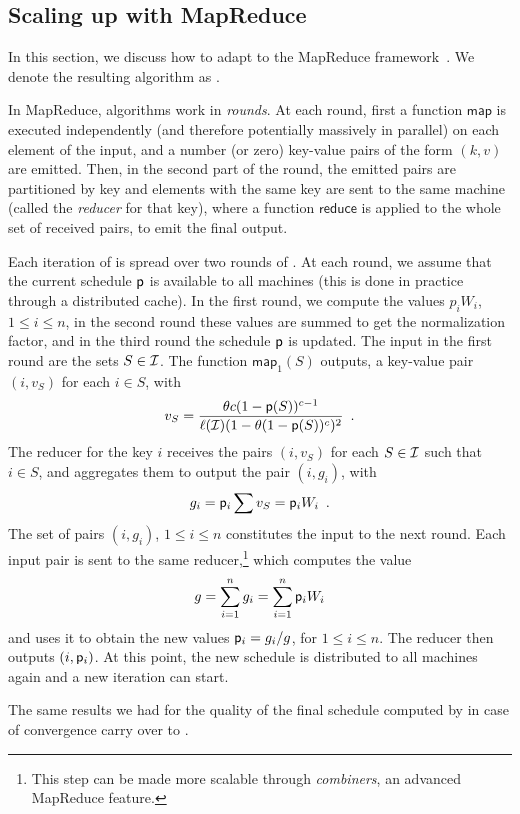 \subsection{Scaling up with MapReduce}\label{sec:mapreduce}
In this section, we discuss how to adapt \algonameapx to the
MapReduce framework~\citep{dean2008mapreduce}. We denote the resulting algorithm
as \algonamemr.

In MapReduce, algorithms work in \emph{rounds}. At each round, first a function
$\mathsf{map}$ is executed independently (and therefore potentially massively in
parallel) on each element of the input, and a number (or zero) key-value pairs
of the form $(k,v)$ are emitted. Then, in the second part of the round, the
emitted pairs are partitioned by key and elements with the same key are sent to
the same machine (called the \emph{reducer} for that key), where a function
$\mathsf{reduce}$ is applied to the whole set of received pairs, to emit the
final output.

Each iteration of \algonameapx is spread over two rounds of \algonamemr. At
each round, we assume that the current schedule $\mathsf{p}$ is available to all
machines (this is done in practice through a distributed cache). In the first
round, we compute the values $p_iW_i$, $1\le i\le n$, in the second round these
values are summed to get the normalization factor, and in the third round the
schedule $\mathsf{p}$ is updated. The input in the first round are the sets
$S\in\mathcal{I}$. The function $\mathsf{map}_1(S)$ outputs, a key-value pair
$(i,v_S)$ for each $i\in S$, with
\[
	v_S = \frac{\theta c
		(1-\mathsf{p}(S))^{c-1}}{\ell(\mathcal{I})(1-\theta(1-\mathsf{p}(S))^c)^2}\enspace.
\]
The reducer for the key $i$ receives the pairs $(i,v_S)$ for each $S\in\mathcal{I}$
such that $i\in S$, and aggregates them to output the pair $(i,g_i)$, with
\[
g_i=\mathsf{p}_i\sum v_S = \mathsf{p}_i W_i\enspace.
\]
The set of pairs $(i, g_i)$, $1\le i\le n$ constitutes the input to the
next round. Each input pair is sent to the same reducer,\footnote{This step can
	be made more scalable through \emph{combiners}, an advanced MapReduce
feature.} which computes the
value
\[
	g = \sum_{i=1}^n g_i = \sum_{i=1}^n\mathsf{p}_iW_i
\]
and uses it to obtain the new values $\mathsf{p}_i = g_i / g$, for $1\le i\le n$.
The reducer then outputs $(i,\mathsf{p}_i)$.  At this point, the new schedule is
distributed to all machines again and a new iteration can start.

The same results we had for the quality of the final schedule computed by
\algonameapx in case of convergence carry over to \algonamemr.
